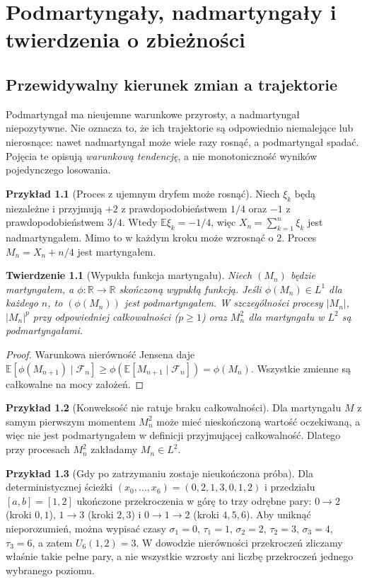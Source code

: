 \documentclass[11pt,a4paper,oneside]{report}
\numberwithin{equation}{chapter}
\theoremstyle{plain}
\newtheorem{twierdzenie}{Twierdzenie}[chapter]
\theoremstyle{definition}
\newtheorem{przyklad}{Przykład}[chapter]
\theoremstyle{remark}
\newcommand{\R}{\mathbb{R}}
\newcommand{\E}{\mathbb{E}}
\begin{document}
\chapter{Podmartyngały, nadmartyngały i twierdzenia o zbieżności}
\label{ch:nadmartyngaly}

\section{Przewidywalny kierunek zmian a trajektorie}

Podmartyngał ma nieujemne warunkowe przyrosty,
a nadmartyngał niepozytywne. Nie oznacza to,
że ich trajektorie są odpowiednio niemalejące
lub nierosnące: nawet nadmartyngał może
wiele razy rosnąć, a podmartyngał spadać.
Pojęcia te opisują \emph{warunkową tendencję},
a nie monotoniczność wyników pojedynczego losowania.

\begin{przyklad}[Proces z ujemnym dryfem może rosnąć]
Niech $\xi_k$ będą niezależne i przyjmują
$+2$ z prawdopodobieństwem $1/4$ oraz $-1$
z prawdopodobieństwem $3/4$. Wtedy
$\E\xi_k=-1/4$, więc
$X_n=\sum_{k=1}^n\xi_k$ jest nadmartyngałem.
Mimo to w każdym kroku może wzrosnąć o $2$.
Proces $M_n=X_n+n/4$ jest martyngałem.
\end{przyklad}

\begin{twierdzenie}[Wypukła funkcja martyngału]
Niech $(M_n)$ będzie martyngałem,
a $\phi:\R\to\R$ skończoną wypukłą funkcją.
Jeśli $\phi(M_n)\in L^1$ dla każdego $n$,
to $(\phi(M_n))$ jest podmartyngałem.
W szczególności procesy $|M_n|$, $|M_n|^p$
przy odpowiedniej całkowalności ($p\geq1$)
oraz $M_n^2$ dla martyngału w $L^2$
są podmartyngałami.
\end{twierdzenie}
\begin{proof}
Warunkowa nierówność Jensena daje
$\E[\phi(M_{n+1})\mid\mathcal F_n]
\geq\phi(\E[M_{n+1}\mid\mathcal F_n])
=\phi(M_n)$. Wszystkie zmienne są całkowalne
na mocy założeń.
\end{proof}

\begin{przyklad}[Konweksość nie ratuje braku całkowalności]
Dla martyngału $M$ z samym pierwszym momentem
$M_n^2$ może mieć nieskończoną wartość oczekiwaną,
a więc nie jest podmartyngałem w definicji
przyjmującej całkowalność. Dlatego przy procesach
$M_n^2$ zakładamy $M_n\in L^2$.
\end{przyklad}

\begin{przyklad}[Gdy po zatrzymaniu zostaje nieukończona próba]
Dla deterministycznej ścieżki
$(x_0,\ldots,x_6)=(0,2,1,3,0,1,2)$
i przedziału $[a,b]=[1,2]$ ukończone przekroczenia w górę to trzy odrębne pary:
$0\to2$ (kroki $0,1$), $1\to3$ (kroki $2,3$)
i $0\to1\to2$ (kroki $4,5,6$).
Aby uniknąć nieporozumień, można wypisać czasy
$\sigma_1=0$, $\tau_1=1$,
$\sigma_2=2$, $\tau_2=3$,
$\sigma_3=4$, $\tau_3=6$,
a zatem $U_6(1,2)=3$. W dowodzie nierówności
przekroczeń zliczamy właśnie takie pełne pary,
a nie wszystkie wzrosty ani liczbę przekroczeń
jednego wybranego poziomu.
\end{przyklad}
\end{document}
